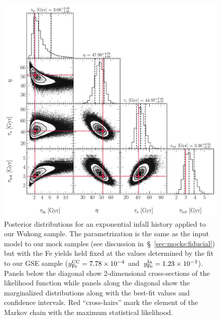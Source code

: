 \documentclass[ms.tex]{subfiles}
\begin{document}
\begin{figure}
\centering
\includegraphics[scale = 0.52]{wukong_512k.pdf}
\caption{
Posterior distributions for an exponential infall history applied to our Wukong
sample.
The parametrization is the same as the input model to our mock samples (see
discussion in~\S~\ref{sec:mocks:fiducial}) but with the Fe yields held fixed
at the values determined by the fit to our GSE sample
($y_\text{Fe}^\text{CC} = 7.78\times10^{-4}$ and~$y_\text{Fe}^\text{Ia} = 1.23\times10^{-3}$).
Panels below the diagonal show 2-dimensional cross-sections of the likelihood
function while panels along the diagonal show the marginalized distributions
along with the best-fit values and confidence intervals.
Red ``cross-hairs'' mark the element of the Markov chain with the maximum
statistical likelihood.
}
\label{fig:wukong_corner}
\end{figure}
\end{document}

